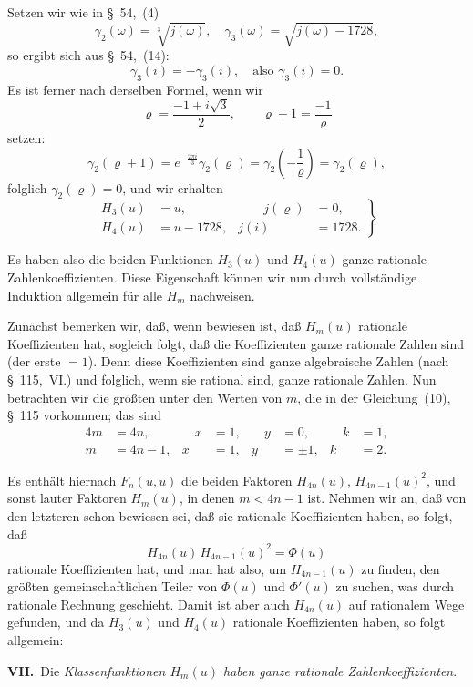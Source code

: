 \documentclass[12pt,a4paper]{article}
\theoremstyle{weber}
\begin{document}
Setzen wir wie in \S~54,~(4)
\[
\gamma_2(\omega) = \sqrt[3]{j(\omega)}, \quad \gamma_3(\omega) = \sqrt{j(\omega) - 1728},
\]
so ergibt sich aus \S~54,~(14):
\[
\gamma_3(i) = -\gamma_3(i), \quad \text{also } \gamma_3(i) = 0.
\]
Es ist ferner nach derselben Formel, wenn wir
\[
\varrho = \frac{-1 + i\sqrt{3}}{2}, \qquad \varrho + 1 = \frac{-1}{\varrho}
\]
setzen:
\[
\gamma_2(\varrho + 1) = e^{-\frac{2\pi i}{3}} \gamma_2(\varrho) = \gamma_2\left(-\frac{1}{\varrho}\right) = \gamma_2(\varrho),
\]
folglich $\gamma_2(\varrho) = 0$, und wir erhalten
\begin{equation}
\left.\begin{aligned}
H_3(u) &= u, &\qquad j(\varrho) &= 0,\\
H_4(u) &= u - 1728, & j(i) &= 1728.
\end{aligned}\right\}
\end{equation}

Es haben also die beiden Funktionen $H_3(u)$ und $H_4(u)$ ganze rationale Zahlenkoeffizienten. Diese Eigenschaft können wir nun durch vollständige Induktion allgemein für alle $H_m$ nachweisen.

Zunächst bemerken wir, daß, wenn bewiesen ist, daß $H_m(u)$ rationale Koeffizienten hat, sogleich folgt, daß die Koeffizienten ganze rationale Zahlen sind (der erste $= 1$). Denn diese Koeffizienten sind ganze algebraische Zahlen (nach \S~115,~VI.) und folglich, wenn sie rational sind, ganze rationale Zahlen. Nun betrachten wir die größten unter den Werten von $m$, die in der Gleichung~(10), \S~115 vorkommen; das sind
\begin{alignat*}{4}
m &= 4n, &\quad x &= 1, &\quad y &= 0, &\quad k &= 1,\\
m &= 4n-1, & x &= 1, & y &= \pm 1, & k &= 2.
\end{alignat*}

Es enthält hiernach $F_n(u, u)$ die beiden Faktoren $H_{4n}(u)$, $H_{4n-1}(u)^2$, und sonst lauter Faktoren $H_m(u)$, in denen $m < 4n-1$ ist. Nehmen wir an, daß von den letzteren schon bewiesen sei, daß sie rationale Koeffizienten haben, so folgt, daß
\[
H_{4n}(u)\,H_{4n-1}(u)^2 = \Phi(u)
\]
rationale Koeffizienten hat, und man hat also, um $H_{4n-1}(u)$ zu finden, den größten gemeinschaftlichen Teiler von $\Phi(u)$ und $\Phi'(u)$ zu suchen, was durch rationale Rechnung geschieht. Damit ist aber auch $H_{4n}(u)$ auf rationalem Wege gefunden, und da $H_3(u)$ und $H_4(u)$ rationale Koeffizienten haben, so folgt allgemein:

\medskip
\textbf{VII.}\ Die \textit{Klassenfunktionen $H_m(u)$ haben ganze rationale Zahlenkoeffizienten}.
\end{document}
